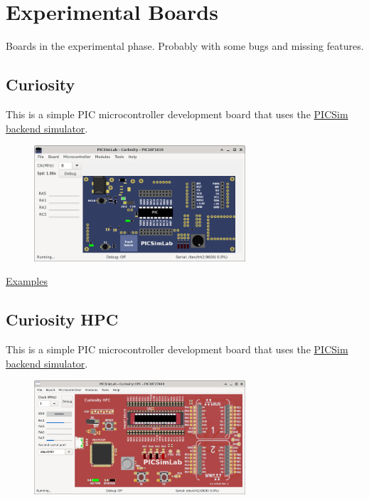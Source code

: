 \chapter{Experimental Boards} \hypertarget{def:eboards}{}

Boards in the experimental phase. Probably with some bugs and missing features. 

\section{Curiosity }

This is a simple PIC microcontroller development board that uses the
\hyperlink{def:PICSim}{PICSim backend simulator}.

\begin{figure}[H]
\center
\includegraphics[width=0.7\textwidth]{img/Curiosity.png} 
\end{figure} 

\href{https://lcgamboa.github.io/picsimlab_examples/board_Curiosity.html}{Examples}

\section{Curiosity HPC}

This is a simple PIC microcontroller development board that uses the
\hyperlink{def:PICSim}{PICSim backend simulator}.

\begin{figure}[H]
\center
\includegraphics[width=0.7\textwidth]{img/Curiosity_HPC.png} 
\end{figure} 

